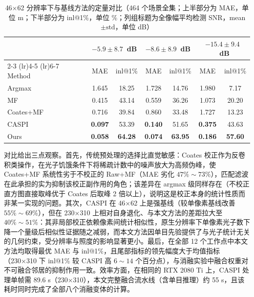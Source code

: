 \begin{table}[t]
\centering
\caption{46×62 分辨率下与基线方法的定量对比（464 个场景全集；上半部分为 MAE，单位 m；下半部分为 inl@1\%，单位 \%；列组标题为全像幅平均检测 SNR，mean$\pm\mathrm{std}$，单位 dB）}
\label{tab:comp46}\scriptsize\setlength{\tabcolsep}{6.5pt}
\begin{tabular}{l cc cc cc}
\toprule
 & \multicolumn{2}{c}{$-5.9 \pm 8.7$~dB} & \multicolumn{2}{c}{$-8.6 \pm 8.9$~dB} & \multicolumn{2}{c}{$-15.4 \pm 9.4$~dB} \\
\cmidrule(lr){2-3} \cmidrule(lr){4-5} \cmidrule(lr){6-7}
Method & MAE & inl@1\% & MAE & inl@1\% & MAE & inl@1\% \\
\midrule
Argmax    & 1.645 & 18.25 & 1.728 & 14.76 & 1.980 & 7.17 \\
MF        & 0.415 & 43.14 & 0.559 & 36.26 & 1.073 & 20.20 \\
Coates+MF & 0.716 & 39.84 & 0.860 & 33.48 & 1.727 & 13.23 \\
CASPI     & \textbf{0.097} & 53.39 & \textbf{0.140} & 51.65 & \textbf{0.375} & 43.63 \\
Ours      & \textbf{0.058} & \textbf{64.28} & \textbf{0.074} & \textbf{63.95} & \textbf{0.186} & \textbf{57.60} \\
\bottomrule
\end{tabular}
\end{table}

对比给出三点观察。首先，传统预处理的选择比直觉敏感：Coates 校正作为反卷积类操作，在光子饥饿条件下将稀疏计数中的噪声放大为高频伪峰，使 Coates+MF 系统性劣于不校正的 Raw+MF（MAE 劣化 $47\%\sim73\%$），匹配滤波在此承担的实为抑制该校正副作用的角色；该差异在 argmax 级同样存在（不校正直方图直接取峰优于 Coates 后取峰 2 倍以上），说明这是校正本身的统计性质而非某一实现的问题。其次，CASPI 在 46×62 上是强基线（较单像素基线改善 $55\%\sim69\%$），但在 230×310 上相对自身退化、与本文方法的差距拉大至 $40\%\sim51\%$：其非局部校正依赖像素间统计相似性，原生分辨率下单像素光子数下降一个量级后相似性证据随之减弱，而本文方法因单目先验提供了与光子统计无关的几何约束，受分辨率与照度的影响显著更小。最后，在全部 12 个工作点中本文方法均取得最优 MAE 与 inl@1\%，且尾部指标的领先幅度大于均值指标（230×310 下 inl@1\% 较 CASPI 高 $6\sim14$ 个百分点），与消融实验中融合权重对不可融合邻居的抑制作用一致。效率方面，在相同的 RTX 2080 Ti 上，CASPI 处理单帧需 89.6 s（230×310），本文完整融合流水线（含单目推理）约 55 s，且该耗时同时完成了全部八个消融变体的计算。
